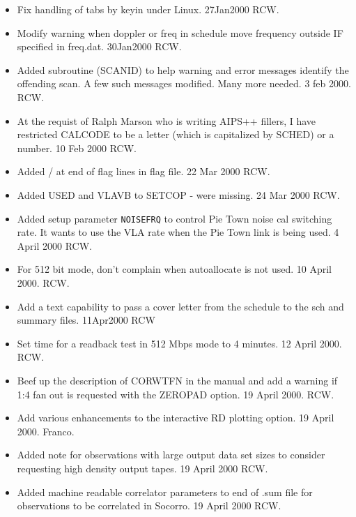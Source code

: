 \documentclass{report}
\begin{document}
\begin{itemize}
\item Fix handling of tabs by keyin under Linux.  27Jan2000 RCW.

\item Modify warning when doppler or freq in schedule move frequency
      outside IF specified in freq.dat.  30Jan2000 RCW.

\item Added subroutine (SCANID) to help warning and error messages
      identify the offending scan.  A few such messages modified.
      Many more needed. 3 feb 2000. RCW.
\item At the requist of Ralph Marson who is writing AIPS++ fillers,
      I have restricted CALCODE to be a letter (which is capitalized
      by SCHED) or a number.  10 Feb 2000  RCW.

\item Added / at end of flag lines in flag file.  22 Mar 2000 RCW.

\item Added USED and VLAVB to SETCOP - were missing. 24 Mar 2000 RCW.

\item Added setup parameter {\tt NOISEFRQ} to control Pie Town noise
      cal switching rate.  It wants to use the VLA rate when the
      Pie Town link is being used.  4 April 2000  RCW.

\item For 512 bit mode, don't complain when autoallocate is not used.
      10 April 2000.  RCW.

\item Add a text capability to pass a cover letter from the schedule
      to the sch and summary files.  11Apr2000 RCW

\item Set time for a readback test in 512 Mbps mode to 4 minutes.
      12 April 2000.  RCW.

\item Beef up the description of CORWTFN in the manual and add a
      warning if 1:4 fan out is requested with the ZEROPAD option.
      19 April 2000.  RCW.

\item Add various enhancements to the interactive RD plotting option.
      19 April 2000.  Franco.

\item Added note for observations with large output data set sizes to
      consider requesting high density output tapes.  19 April 2000 RCW.

\item Added machine readable correlator parameters to end of .sum file
      for observations to be correlated in Socorro.  19 April 2000 RCW.


\end{itemize}
\end{document}
